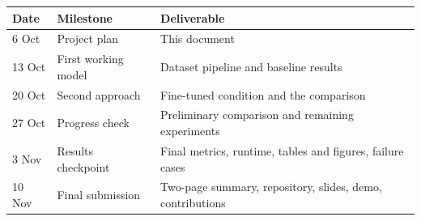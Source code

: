 \documentclass[10pt,a4paper]{article}
\begin{document}
\begin{tabular}{@{}llp{10.4cm}@{}}
\toprule
\textbf{Date} & \textbf{Milestone} & \textbf{Deliverable} \\
\midrule
6 Oct & Project plan & This document \\
13 Oct & First working model & Dataset pipeline and baseline results \\
20 Oct & Second approach & Fine-tuned condition and the comparison \\
27 Oct & Progress check & Preliminary comparison and remaining experiments \\
3 Nov & Results checkpoint & Final metrics, runtime, tables and figures, failure cases \\
10 Nov & Final submission & Two-page summary, repository, slides, demo, contributions \\
\bottomrule
\end{tabular}
\end{document}

